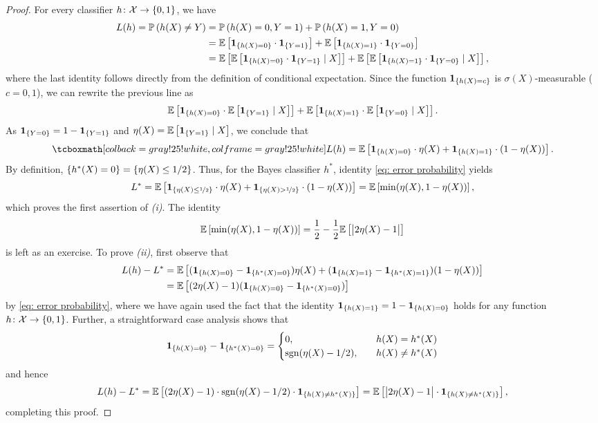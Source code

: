 \begin{proof}
For every classifier $h \colon \mathcal{X} \to \left\{0, 1\right\}$, we have
\begin{align*}
    L(h) = \mathbb{P}\left(h(X) \neq Y\right) &= \mathbb{P}\left(h(X) = 0, Y = 1\right) + \mathbb{P}\left(h(X) = 1, Y = 0\right) \\
        &= \mathbb{E}\left[\mathbf{1}_{\left\{h(X) = 0\right\}} \cdot \mathbf{1}_{\left\{Y = 1\right\}}\right] + \mathbb{E}\left[\mathbf{1}_{\left\{h(X) = 1\right\}} \cdot \mathbf{1}_{\left\{Y = 0\right\}}\right] \\
        &= \mathbb{E}\left[\mathbb{E}\left[\mathbf{1}_{\left\{h(X) = 0\right\}} \cdot \mathbf{1}_{\left\{Y = 1\right\}} \mathrel{|} X\right]\right] + \mathbb{E}\left[\mathbb{E}\left[\mathbf{1}_{\left\{h(X) = 1\right\}} \cdot \mathbf{1}_{\left\{Y = 0\right\}} \mathrel{|} X\right]\right],
\end{align*}
where the last identity follows directly from the definition of conditional expectation. Since the function $\mathbf{1}_{\left\{h(X) = c\right\}}$ is $\sigma(X)$-measurable ($c = 0, 1$), we can rewrite the previous line as
\[
    \mathbb{E}\left[\mathbf{1}_{\left\{h(X) = 0\right\}} \cdot \mathbb{E}\left[\mathbf{1}_{\left\{Y = 1\right\}} \mathrel{|} X\right]\right] + \mathbb{E}\left[\mathbf{1}_{\left\{h(X) = 1\right\}} \cdot \mathbb{E}\left[\mathbf{1}_{\left\{Y = 0\right\}} \mathrel{|} X\right]\right].
\]
As $\mathbf{1}_{\left\{Y = 0\right\}} = 1 - \mathbf{1}_{\left\{Y = 1\right\}}$ and $\eta(X) = \mathbb{E}\left[\mathbf{1}_{\left\{Y = 1\right\}} \mathrel{|} X\right]$, we conclude that
\begin{equation}
    \label{eq: error probability}
    \highlightMath{
        L(h) = \Ex{\indSet{h(X) = 0} \cdot \eta(X) + \indSet{h(X) = 1} \cdot (1 - \eta(X))}.
    }
\end{equation}
By definition, $\left\{h^*(X) = 0\right\} = \left\{\eta(X) \leq 1/2\right\}$. Thus, for the Bayes classifier $h^*$, identity \eqref{eq: error probability} yields
\[
    L^* = \mathbb{E}\left[\mathbf{1}_{\left\{\eta(X) \leq \nicefrac{1}{2}\right\}} \cdot \eta(X) + \mathbf{1}_{\left\{\eta(X) > \nicefrac{1}{2}\right\}} \cdot (1 - \eta(X))\right] = \mathbb{E}\left[\min(\eta(X), 1 - \eta(X))\right],
\]
which proves the first assertion of \emph{(i)}. The identity
\[
    \mathbb{E}\left[\min(\eta(X), 1 - \eta(X))\right] = \frac{1}{2} - \frac{1}{2} \mathbb{E}\left[\big\lvert 2\eta(X) - 1 \big\rvert\right]
\]
is left as an exercise. To prove \emph{(ii)}, first observe that
\begin{align*}
    L(h) - L^*& = \mathbb{E}\left[(\mathbf{1}_{\left\{h(X) = 0\right\}} - \mathbf{1}_{\left\{h^*(X) = 0\right\}}) \eta(X) + (\mathbf{1}_{\left\{h(X) = 1\right\}} - \mathbf{1}_{\left\{h^*(X) = 1\right\}}) (1 - \eta(X))\right] \\
        &= \mathbb{E}\left[(2 \eta(X) - 1) (\mathbf{1}_{\left\{h(X) = 0\right\}} - \mathbf{1}_{\left\{h^*(X) = 0\right\}})\right]
\end{align*}
by \eqref{eq: error probability}, where we have again used the fact that the identity $\mathbf{1}_{\left\{h(X) = 1\right\}} = 1 - \mathbf{1}_{\left\{h(X) = 0\right\}}$ holds for any function $h \colon \mathcal{X} \to \left\{0, 1\right\}$. Further, a straightforward case analysis shows that
\[
    \mathbf{1}_{\left\{h(X) = 0\right\}} - \mathbf{1}_{\left\{h^*(X) = 0\right\}} = \begin{cases}
        0, \quad & h(X) = h^*(X) \\
        \mathrm{sgn}(\eta(X) - 1/2), \quad & h(X) \neq h^*(X)
    \end{cases}
\]
and hence
\[
    L(h) - L^* = \mathbb{E}\left[(2\eta(X) - 1) \cdot \mathrm{sgn}(\eta(X) - 1/2) \cdot \mathbf{1}_{\left\{h(X) \neq h^*(X)\right\}}\right] = \mathbb{E}\left[\big\lvert 2\eta(X) - 1 \big\rvert \cdot \mathbf{1}_{\left\{h(X) \neq h^*(X)\right\}}\right],
\]
completing this proof.
\end{proof}

